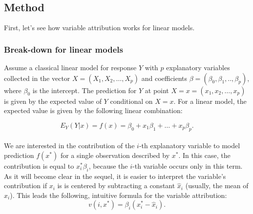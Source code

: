 \documentclass[12pt,]{krantz}
\begin{document}
\hypertarget{BDMethod}{%
\subsection{Method}\label{BDMethod}}

First, let's see how variable attribution works for linear models.

\hypertarget{break-down-for-linear-models}{%
\subsubsection{Break-down for linear models}\label{break-down-for-linear-models}}

Assume a classical linear model for response \(Y\) with \(p\) explanatory variables collected in the vector \(X = (X_1, X_2, \ldots, X_p)\) and coefficients \(\beta = (\beta_0, \beta_1, .., \beta_p)\), where \(\beta_0\) is the intercept. The prediction for \(Y\) at point \(X=x=(x_1, x_2, \ldots, x_p)\) is given by the expected value of \(Y\) conditional on \(X=x\). For a linear model, the expected value is given by the following linear combination:

\[
E_Y(Y | x) = f(x) = \beta_0 + x_1 \beta_1 + \ldots + x_p \beta_p.
\]\\
We are interested in the contribution of the \(i\)-th explanatory variable to model prediction \(f(x^*)\) for a single observation described by \(x^*\). In this case, the contribution is equal to \(x^*_i\beta_i\), because the \(i\)-th variable occurs only in this term. As it will become clear in the sequel, it is easier to interpret the variable's contribution if \(x_i\) is is centered by subtracting a constant \(\hat x_i\) (usually, the mean of \(x_i\)). This leads the following, intuitive formula for the variable attribution:
\[
v(i, x^*) = \beta_i (x_i^* - \hat x_i).
\]
\end{document}
